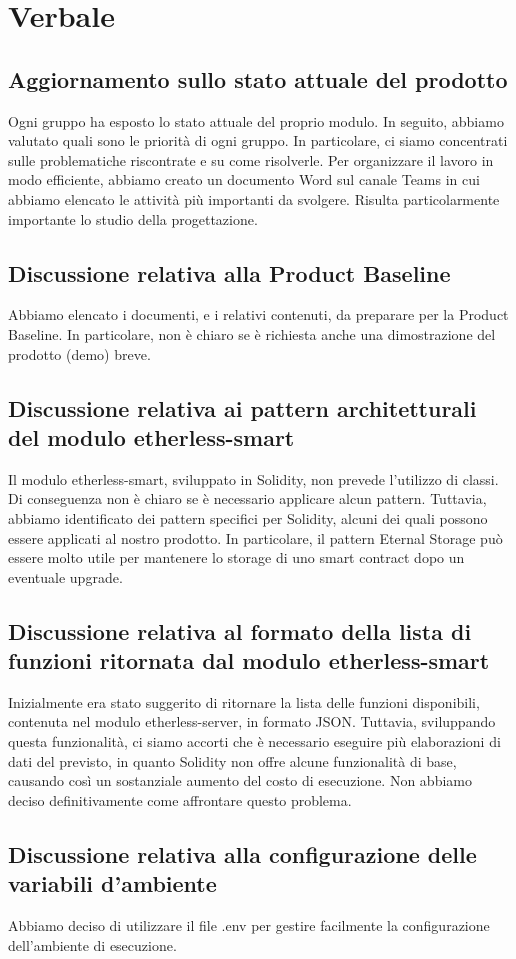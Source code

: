\section{Verbale}
	\subsection{Aggiornamento sullo stato attuale del prodotto}
	Ogni gruppo ha esposto lo stato attuale del proprio modulo\textit{}.
	In seguito, abbiamo valutato quali sono le priorità di ogni gruppo. In particolare, ci siamo concentrati sulle problematiche riscontrate e su come risolverle. Per organizzare il lavoro in modo efficiente, abbiamo creato un documento Word sul canale Teams\textit{} in cui abbiamo elencato le attività più importanti da svolgere. Risulta particolarmente importante lo studio della progettazione. 
	\subsection{Discussione relativa alla Product Baseline}
	Abbiamo elencato i documenti, e i relativi contenuti, da preparare per la Product Baseline. In particolare, non è chiaro se è richiesta anche una dimostrazione del prodotto (demo) breve.
	\subsection{Discussione relativa ai pattern architetturali del modulo etherless-smart}
	Il modulo etherless-smart, sviluppato in Solidity\textit{}, non prevede l'utilizzo di classi. Di conseguenza non è chiaro se è necessario applicare alcun pattern. Tuttavia, abbiamo identificato dei pattern specifici per Solidity\textit{}, alcuni dei quali possono essere applicati al nostro prodotto. In particolare, il pattern Eternal Storage può essere molto utile per mantenere lo storage di uno smart contract\textit{} dopo un eventuale upgrade.
	\subsection{Discussione relativa al formato della lista di funzioni ritornata dal modulo etherless-smart}
	Inizialmente era stato suggerito di ritornare la lista delle funzioni disponibili, contenuta nel modulo\textit{} etherless-server, in formato JSON\textit{}. Tuttavia, sviluppando questa funzionalità, ci siamo accorti che è necessario eseguire più elaborazioni di dati del previsto, in quanto Solidity\textit{} non offre alcune funzionalità di base, causando così un sostanziale aumento del costo di esecuzione. Non abbiamo deciso definitivamente come affrontare questo problema.
	\subsection{Discussione relativa alla configurazione delle variabili d'ambiente}
    Abbiamo deciso di utilizzare il file .env per gestire facilmente la configurazione dell'ambiente di esecuzione.